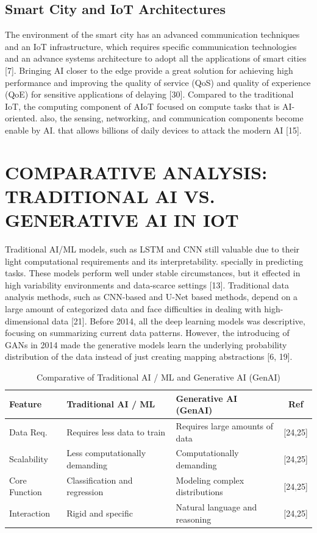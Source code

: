 \documentclass[journal]{IEEEtran}
\begin{document}
\subsection{Smart City and IoT Architectures}
The environment of the smart city has an advanced communication techniques and an IoT infrastructure, which requires specific communication technologies and an advance systems architecture to adopt all the applications of smart cities [7]. Bringing AI closer to the edge provide a great solution for achieving high performance and improving the quality of service (QoS) and quality of experience (QoE) for sensitive applications of delaying [30]. Compared to the traditional IoT, the computing component of AIoT focused on compute tasks that is AI-oriented. also, the sensing, networking, and communication components become enable by AI. that allows billions of daily devices to attack the modern AI [15].\\
\section{COMPARATIVE ANALYSIS: TRADITIONAL AI VS. GENERATIVE AI IN IOT}
Traditional AI/ML models, such as LSTM and CNN still valuable due to their light computational requirements and its interpretability. specially in predicting tasks. These models perform well under stable circumstances, but it effected in high variability environments and data-scarce settings [13]. Traditional data analysis methods, such as CNN-based and U-Net based methods, depend on a large amount of categorized data and face difficulties in dealing with high-dimensional data [21]. Before 2014, all the deep learning models was descriptive, focusing on summarizing current data patterns. However, the introducing of GANs in 2014 made the generative models learn the underlying probability distribution of the data instead of just creating mapping abstractions [6, 19].
\begin{table}[h]
\centering
\caption{Comparative of Traditional AI / ML and Generative AI (GenAI)}
\label{tab:ai_comparison}
\setlength{\tabcolsep}{3pt} %
\small %
\begin{tabular}{@{} p{1.6cm} p{2.8cm} p{2.8cm} c @{}}
\toprule
\textbf{Feature} & \textbf{Traditional AI / ML} & \textbf{Generative AI (GenAI)} & \textbf{Ref} \\
\midrule
Data Req. & Requires less data to train & Requires large amounts of data & [24,25] \\
\addlinespace
Scalability & Less computationally demanding & Computationally demanding & [24,25] \\
\addlinespace
Core Function & Classification and regression & Modeling complex distributions & [24,25] \\
\addlinespace
Interaction & Rigid and specific & Natural language and reasoning & [24,25] \\
\bottomrule
\end{tabular}
\end{table}
\end{document}
